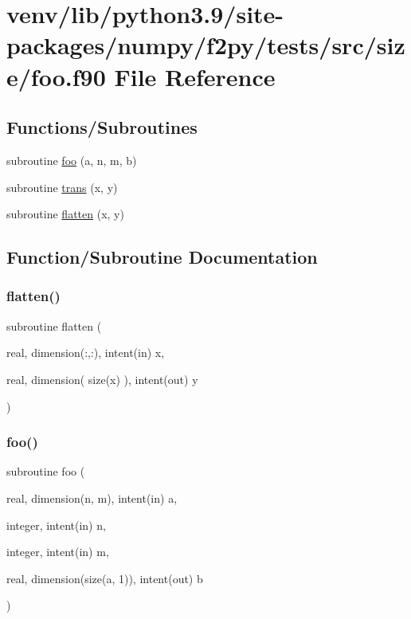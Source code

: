 \hypertarget{size_2foo_8f90}{}\section{venv/lib/python3.9/site-\/packages/numpy/f2py/tests/src/size/foo.f90 File Reference}
\label{size_2foo_8f90}
\subsection*{Functions/\+Subroutines}
\begin{DoxyCompactItemize}
\item 
subroutine \hyperlink{size_2foo_8f90_a6e9dfcbd55e5ab1066524746915b4f19}{foo} (a, n, m, b)
\item 
subroutine \hyperlink{size_2foo_8f90_afabfd8da71309850231a00e53c61f106}{trans} (x, y)
\item 
subroutine \hyperlink{size_2foo_8f90_a5b6fedc75d027f2d0e1cea960deeec4e}{flatten} (x, y)
\end{DoxyCompactItemize}


\subsection{Function/\+Subroutine Documentation}
\mbox{\label{size_2foo_8f90_a5b6fedc75d027f2d0e1cea960deeec4e}} 
\subsubsection{\texorpdfstring{flatten()}{flatten()}}
{\footnotesize\ttfamily subroutine flatten (\begin{DoxyParamCaption}\item[{real, dimension(\+:,\+:), intent(in)}]{x,  }\item[{real, dimension( size(x) ), intent(out)}]{y }\end{DoxyParamCaption})}

\mbox{\label{size_2foo_8f90_a6e9dfcbd55e5ab1066524746915b4f19}} 
\subsubsection{\texorpdfstring{foo()}{foo()}}
{\footnotesize\ttfamily subroutine foo (\begin{DoxyParamCaption}\item[{real, dimension(n, m), intent(in)}]{a,  }\item[{integer, intent(in)}]{n,  }\item[{integer, intent(in)}]{m,  }\item[{real, dimension(size(a, 1)), intent(out)}]{b }\end{DoxyParamCaption})}

